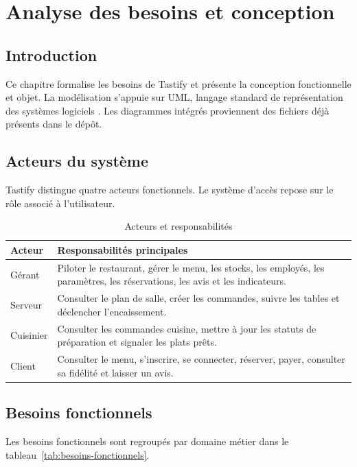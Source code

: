\chapter{Analyse des besoins et conception}
\label{chap:conception}

\section*{Introduction}
Ce chapitre formalise les besoins de Tastify et présente la conception fonctionnelle et objet. La modélisation s'appuie sur UML, langage standard de représentation des systèmes logiciels \cite{uml}. Les diagrammes intégrés proviennent des fichiers déjà présents dans le dépôt.

\section{Acteurs du système}
Tastify distingue quatre acteurs fonctionnels. Le système d'accès repose sur le rôle associé à l'utilisateur.

\begin{table}[H]
\centering
\caption{Acteurs et responsabilités}
\label{tab:acteurs}
\begin{tabularx}{\textwidth}{p{3cm}Y}
\toprule
\textbf{Acteur} & \textbf{Responsabilités principales} \\
\midrule
Gérant & Piloter le restaurant, gérer le menu, les stocks, les employés, les paramètres, les réservations, les avis et les indicateurs. \\
Serveur & Consulter le plan de salle, créer les commandes, suivre les tables et déclencher l'encaissement. \\
Cuisinier & Consulter les commandes cuisine, mettre à jour les statuts de préparation et signaler les plats prêts. \\
Client & Consulter le menu, s'inscrire, se connecter, réserver, payer, consulter sa fidélité et laisser un avis. \\
\bottomrule
\end{tabularx}
\end{table}

\section{Besoins fonctionnels}
Les besoins fonctionnels sont regroupés par domaine métier dans le tableau~\ref{tab:besoins-fonctionnels}.

